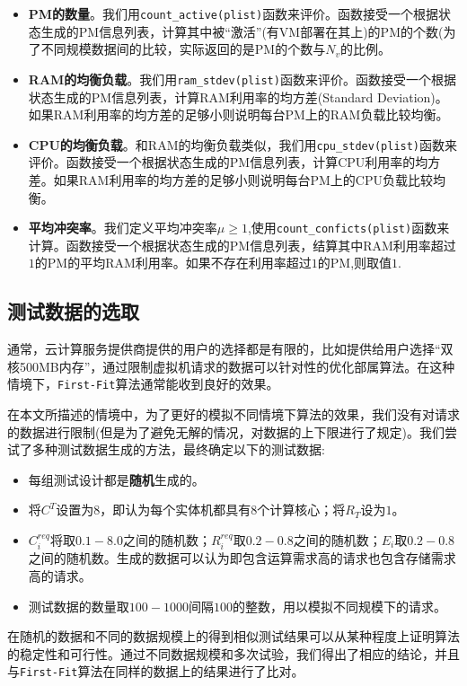 \begin{itemize}
\item \textbf{PM的数量}。我们用\texttt{count\_active(plist)}函数来评价。函数接受一个根据状态生成的PM信息列表，计算其中被``激活''(有VM部署在其上)的PM的个数(为了不同规模数据间的比较，实际返回的是PM的个数与$N_v$的比例。
\item \textbf{RAM的均衡负载}。我们用\texttt{ram\_stdev(plist)}函数来评价。函数接受一个根据状态生成的PM信息列表，计算RAM利用率的均方差(Standard Deviation)。如果RAM利用率的均方差的足够小则说明每台PM上的RAM负载比较均衡。
\item \textbf{CPU的均衡负载}。和RAM的均衡负载类似，我们用\texttt{cpu\_stdev(plist)}函数来评价。函数接受一个根据状态生成的PM信息列表，计算CPU利用率的均方差。如果RAM利用率的均方差的足够小则说明每台PM上的CPU负载比较均衡。
\item \textbf{平均冲突率}。我们定义平均冲突率$\mu \geq 1$,使用\texttt{count\_conficts(plist)}函数来计算。函数接受一个根据状态生成的PM信息列表，结算其中RAM利用率超过$1$的PM的平均RAM利用率。如果不存在利用率超过$1$的PM,则取值$1$.
\end{itemize}

\subsection*{测试数据的选取}
\label{sec:data}
通常，云计算服务提供商提供的用户的选择都是有限的，比如提供给用户选择``双核500MB内存''，通过限制虚拟机请求的数据可以针对性的优化部属算法。在这种情境下，\texttt{First-Fit}算法通常能收到良好的效果。

在本文所描述的情境中，为了更好的模拟不同情境下算法的效果，我们没有对请求的数据进行限制(但是为了避免无解的情况，对数据的上下限进行了规定)。我们尝试了多种测试数据生成的方法，最终确定以下的测试数据:
\begin{itemize}
\item 每组测试设计都是\textbf{随机}生成的。
\item 将$C^T$设置为$8$，即认为每个实体机都具有$8$个计算核心；将$R_T$设为$1$。
\item $C^{req}_i$将取$0.1-8.0$之间的随机数；$R^{req}_i$取$0.2-0.8$之间的随机数；$E_i$取$0.2-0.8$之间的随机数。生成的数据可以认为即包含运算需求高的请求也包含存储需求高的请求。
\item 测试数据的数量取$100-1000$间隔$100$的整数，用以模拟不同规模下的请求。
\end{itemize}

在随机的数据和不同的数据规模上的得到相似测试结果可以从某种程度上证明算法的稳定性和可行性。通过不同数据规模和多次试验，我们得出了相应的结论，并且与\texttt{First-Fit}算法在同样的数据上的结果进行了比对。

